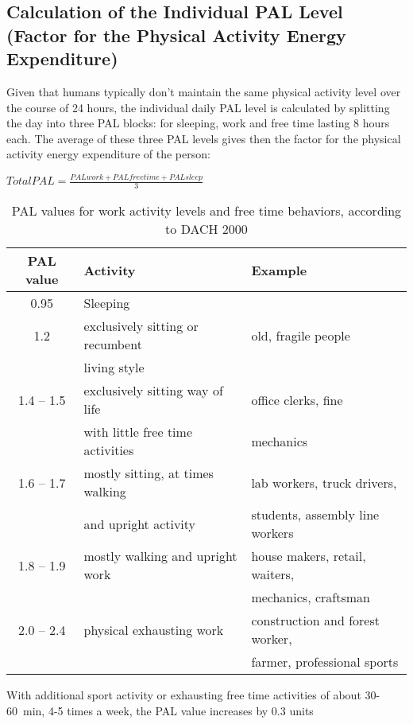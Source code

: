 \documentclass[../main.tex]{subfiles}
\begin{document}
\subsection[Calculation of the Individual PAL Level]{Calculation of the Individual PAL Level (Factor for the Physical Activity Energy Expenditure)}

Given that humans typically don't maintain the same physical activity level over the course of 24 hours, the individual daily PAL level is calculated by splitting the day into three PAL blocks: for sleeping, work and free time lasting 8 hours each.
The average of these three PAL levels gives then the factor for the physical activity energy expenditure of the person:

\vspace{2mm}

\begin{center}
\begin{fminipage}{7cm}
$ Total PAL = \frac{PAL work + PAL free time + PAL sleep}{3}$ 
\end{fminipage}
\end{center}

\vspace{2mm}

\begin{table}[htb]
  \centering
  \begin{tabular}{c|l|l}
    \textbf{PAL value} & \textbf{Activity} & \textbf{Example} \\
    \hline
    0.95 & Sleeping \\
    1.2 & exclusively sitting or recumbent & old, fragile people \\
    & living style \\
    1.4 -- 1.5 & exclusively sitting way of life & office clerks, fine \\
              & with little free time activities  & mechanics \\
    1.6 -- 1.7& mostly sitting, at times walking& lab workers, truck drivers, \\
              & and upright activity & students, assembly line workers\\
    1.8 -- 1.9 & mostly walking and upright work & house makers, retail, waiters,\\
              & & mechanics, craftsman\\
    2.0 -- 2.4 & physical exhausting work & construction and forest worker, \\
    & & farmer, professional sports\\
  \end{tabular}
  \vspace{1mm}
  
  \noindent With additional sport activity or exhausting free time activities of about 30-60~min, 4-5 times a week, the PAL value increases by 0.3 units
  \caption{PAL values for work activity levels and free time behaviors, according to DACH 2000}
\end{table}
\end{document}

